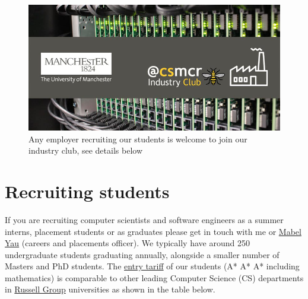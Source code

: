 \documentclass[
  12pt,
]{book}
\begin{document}
\begin{figure}

{\centering \includegraphics[width=1\linewidth]{images/industry-club-wide} 

}

\caption{Any employer recruiting our students is welcome to join our industry club, see details below}\label{fig:unnamed-chunk-2}
\end{figure}

\hypertarget{recruiting}{%
\section{Recruiting students}\label{recruiting}}

If you are recruiting computer scientists and software engineers as a summer interns, placement students or as graduates please get in touch with me or \href{https://uk.linkedin.com/in/mabel-yau}{Mabel Yau} (careers and placements officer). We typically have around 250 undergraduate students graduating annually, alongside a smaller number of Masters and PhD students. The \href{https://www.ucas.com/ucas/tariff-calculator}{entry tariff} of our students (A* A* A* including mathematics) is comparable to other leading Computer Science (CS) departments in \href{https://en.wikipedia.org/wiki/Russell_Group}{Russell Group} universities as shown in the table below.
\end{document}
